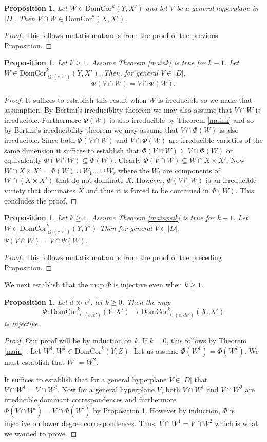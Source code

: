 \documentclass[12pt]{amsart}
\numberwithin{equation}{section}
\newtheorem{proposition}[theorem]{Proposition}
\numberwithin{theorem}{section}
\theoremstyle{definition}
\theoremstyle{definition}
\def \DC{{\mathrm{DomCor}}}
\begin{document}
\begin{proposition}
     Let $W \in \DC^k(Y,X')$ and let $V$ be a general hyperplane in $|D|$. Then $V \cap W \in \DC^{k}(X, X')$. 
\end{proposition}
\begin{proof}
 This follows mutatis mutandis from the proof of the previous Proposition.
\end{proof}
\begin{proposition}\label{capPhi}
    Let $k\ge 1$. Assume Theorem \ref{maink}  is true for $k-1$. Let $W \in \DC^k_{\le (e,e')}(Y, X').$
    Then, for general $V \in |D|$, $$\Phi(V \cap W) = V \cap \Phi(W).$$
\end{proposition}
\begin{proof}
 It suffices to establish this result when $W$ is irreducible so we make that assumption. By Bertini's irreduciblity theorem we may also assume that  $V \cap W$ is irreducible. Furthermore $\Phi(W)$ is also irreducible by Theorem \ref{maink}  and so by Bertini's irreducibility theorem we may assume that $V \cap \Phi(W)$ is also irreducible. Since both $\Phi(V \cap W)$ and $V \cap \Phi(W)$ are irreducible varieties of the same dimension it suffices to establish that $\Phi(V \cap W) \subseteq V \cap \Phi(W)$  or equivalently $\Phi(V \cap W) \subseteq \Phi(W)$. Clearly $\Phi(V \cap W) \subseteq W \cap X \times X'$. Now $ W \cap X \times X' = \Phi(W) \cup W_1 \dots \cup W_r $ where the $W_i$ are components of $W \cap (X \times X')$ that do not dominate $X$. However, $\Phi(V \cap W)$ is an irreducible variety that dominates $X$ and thus it is forced to be contained in $\Phi(W)$. This concludes the proof.
\end{proof}
\begin{proposition}
    Let $k \ge 1$.
    Assume Theorem \ref{mainpsik} is true for $k-1$. Let $W \in \DC^k_{\le (e,e')}(Y, Y')$
    Then for general $V \in |D|$, $\Psi(V \cap W) = V \cap \Psi(W).$
\end{proposition}
\begin{proof}
    This follows mutatis mutandis from the proof of the preceding Proposition.
\end{proof}
We next establish that the map $\Phi$ is injective even when $k\ge 1$.
\begin{proposition}
   Let $d \gg e'$, let $ k\ge 0$. Then the map $$\Phi: \DC^k_{\le(e,e')}(Y, X') \to \DC^k_{\le (e,de')}(X, X')$$ is injective.
\end{proposition}
\begin{proof}
    Our proof will be by induction on $k$. If $k =0$, this follows by Theorem \ref{main} . Let $W^1 , W^2 \in \DC^k(Y,Z)$. Let us assume $\Phi(W^1) = \Phi(W^2)$. We must establish that $W^1 = W^2.$

     It suffices to establish that for a general hyperplane $V \in |D|$ that $V \cap W^1 = V \cap W^2$. Now for a general hyperplane $V$, both $V \cap W^1$ and $V\cap W^2$ are irreducible dominant correspondences and furthermore  $\Phi(V \cap W^i) =  V \cap \Phi( W^i)$ by Proposition \ref{capPhi}. However by induction, $\Phi$ is injective on lower degree correspondences. Thus, $V \cap W^1= V \cap W^2$ which is what we wanted to prove.
\end{proof}
\end{document}
